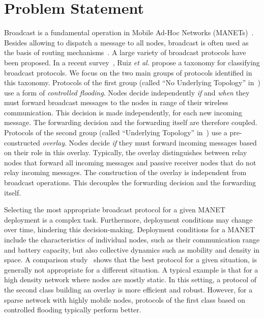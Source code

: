 
\section{Problem Statement}

Broadcast is a fundamental operation in Mobile Ad-Hoc Networks (MANETs)~\cite{SurveyRuiz}.
%
Besides allowing to dispatch a message to all nodes, broadcast is often used as the basis of routing mechanisms~\cite{survey_routing}.
%
A large variety of broadcast protocols have been proposed.
%
In a recent survey~\cite{SurveyRuiz}, Ruiz \emph{et al.} propose a taxonomy for classifying broadcast protocols.
%
We focus on the two main groups of protocols identified in this taxonomy.
%
Protocols of the first group (called ``No Underlying Topology'' in~\cite{SurveyRuiz}) use a form of \emph{controlled flooding}.
Nodes decide independently \emph{if} and \emph{when} they must forward broadcast messages to the nodes in range of their wireless communication.
This decision is made independently, for each new incoming message.
The forwarding decision and the forwarding itself are therefore coupled.
%
Protocols of the second group (called ``Underlying Topology'' in~\cite{SurveyRuiz}) use a pre-constructed \emph{overlay}.
Nodes decide \emph{if} they must forward incoming messages based on their role in this overlay.
Typically, the overlay distinguishes between relay nodes that forward all incoming messages and passive receiver nodes that do not relay incoming messages.
The construction of the overlay is independent from broadcast operations.
This decouples the forwarding decision and the forwarding itself.

Selecting the most appropriate broadcast protocol for a given MANET deployment is a complex task.
Furthermore, deployment conditions may change over time, hindering this decision-making.
Deployment conditions for a MANET include the characteristics of individual nodes, such as their communication range and battery capacity, but also collective dynamics such as mobility and density in space.
A comparison study~\cite{DensityMobDrivenEval} shows that the best protocol for a given situation, is generally not appropriate for a different situation.
A typical example is that for a high density network where nodes are mostly static.
In this setting, a protocol of the second class building an overlay is more efficient and robust.
However, for a sparse network with highly mobile nodes, protocols of the first class based on controlled flooding typically perform better.

